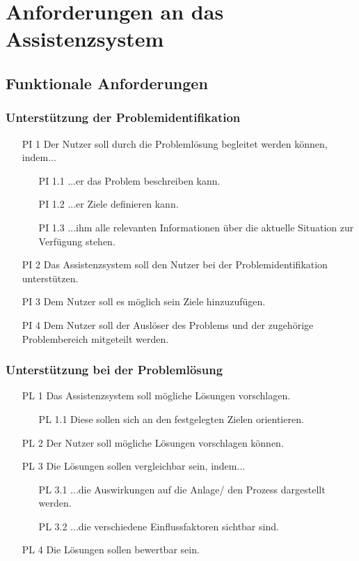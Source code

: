 \section{Anforderungen an das Assistenzsystem}
\label{3:Anforderungen}

\subsection{Funktionale Anforderungen}

\subsubsection*{Unterstützung der Problemidentifikation}
\begin{itemize}
\item[PI 1] Der Nutzer soll durch die Problemlösung begleitet werden können, indem...
	\begin{itemize}
	\item[PI 1.1] ...er das Problem beschreiben kann.
	\item [PI 1.2] ...er Ziele definieren kann.
	\item[PI 1.3] ...ihm alle relevanten Informationen über die aktuelle Situation zur Verfügung stehen.
	\end{itemize}
\item[PI 2] Das Assistenzsystem soll den Nutzer bei der Problemidentifikation unterstützen.
\item[PI 3] Dem Nutzer soll es möglich sein Ziele hinzuzufügen.
\item[PI 4] Dem Nutzer soll der Auslöser des Problems und der zugehörige Problembereich mitgeteilt werden.
\end{itemize}

\subsubsection*{Unterstützung bei der Problemlösung}
\begin{itemize}
\item[PL 1] Das Assistenzsystem soll mögliche Lösungen vorschlagen.
	\begin{itemize}
	\item[PL 1.1] Diese sollen sich an den festgelegten Zielen orientieren.
	\end{itemize}
\item[PL 2] Der Nutzer soll mögliche Lösungen vorschlagen können.
\item[PL 3] Die Lösungen sollen vergleichbar sein, indem...
	\begin{itemize}
	\item[PL 3.1] ...die Auswirkungen auf die Anlage/ den Prozess dargestellt werden.
	\item[PL 3.2] ...die verschiedene Einflussfaktoren sichtbar sind.
	\end{itemize}
\item[PL 4] Die Lösungen sollen bewertbar sein.
\end{itemize}

